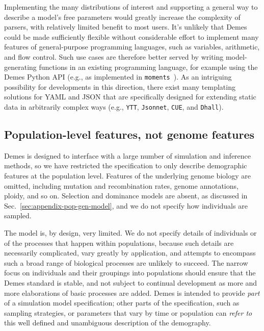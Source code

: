 \documentclass[11pt]{article}
\newcommand{\moments}[0]{\texttt{moments}}
\newcommand{\ggcomment}[1]{{\textcolor{yellow!60!red}{GG: #1}}}
\begin{document}
Implementing the many distributions of interest and supporting a general
way to describe a model's free parameters would greatly increase the
complexity of parsers, with relatively limited benefit to most users.
It's unlikely that Demes could be made sufficiently
flexible without considerable effort to implement many features of
general-purpose programming languages, such as variables, arithmetic,
and flow control.
Such use cases are therefore better served by writing model-generating
functions in an existing programming language, for example
using the Demes Python API (e.g., as implemented in \moments\
\citep{jouganous2017inferring,ragsdale2019models}).
As an intriguing possibility for developments in this direction,
there exist many templating solutions for YAML and JSON that are
specifically designed for extending static data in arbitrarily complex ways
(e.g., \texttt{YTT}, \texttt{Jsonnet}, \texttt{CUE}, and \texttt{Dhall}).


\subsection{Population-level features, not genome features}
\label{sec:appendix-features}

Demes is designed to interface with a large number of simulation and inference
methods, so we have restricted the specification to only describe
demographic features at the population level.
Features of the underlying genome biology are omitted,
including mutation and recombination rates,
genome annotations, ploidy, and so on.
Selection and dominance models are absent, as discussed in
Sec.~\ref{sec:appendix-pop-gen-model}, and we do not
specify how individuals are sampled.

The model is, by design, very limited. We do not specify details of
individuals or of the processes that happen within populations,
because such details are necessarily complicated, vary greatly by
application, and attempts to encompass such a broad range of biological
processes are unlikely to succeed.
The narrow focus on individuals and their groupings into populations
should ensure that the Demes standard is stable, and not subject to
continual development as more and more elaborations of basic processes
are added. Demes is intended to provide \emph{part} of a
simulation model specification; other parts of the specification,
such as sampling strategies, or parameters that vary by time
or population can \emph{refer to} this well defined and unambiguous
description of the demography.
\end{document}
